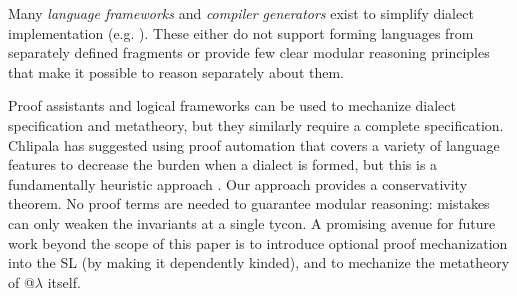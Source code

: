 \documentclass[10pt,preprint]{sigplanconf}
\begin{document}
Many \emph{language frameworks} and \emph{compiler generators} exist to simplify  dialect implementation (e.g. ). %
These either do not support forming languages from separately defined fragments or provide few clear modular reasoning principles that make it possible to reason separately about them. 

Proof assistants and logical frameworks can be used to mechanize dialect specification and metatheory, but they similarly require a complete specification. Chlipala has suggested using  proof automation that covers a variety of language features to decrease the burden when a  dialect is formed, but this is a fundamentally heuristic approach \cite{Chlipala10}. Our approach provides a conservativity theorem. No proof terms are needed to guarantee modular reasoning:   mistakes can only weaken the invariants at a single tycon. %
A promising avenue for future work beyond the scope of this paper is to introduce optional proof mechanization into the SL (by making it dependently kinded), and to mechanize the metatheory of @$\lambda$ itself.%
\end{document}
